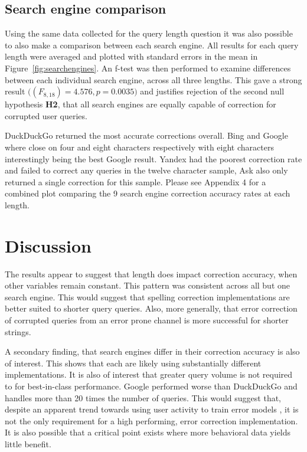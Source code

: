 \documentclass{csfourzero}
\begin{document}
\subsection{Search engine comparison}
Using the same data collected for the query length question it was also possible to also make a comparison between each search engine. All results for each query length were averaged and plotted with standard errors in the mean in Figure~\ref{fig:searchengines}. An f-test was then performed to examine differences between each individual search engine, across all three lengths. This gave a strong result $\big((F_{8,18}) = 4.576, p = 0.0035\big)$ and justifies rejection of the second null hypothesis \textbf{H2}, that all search engines are equally capable of correction for corrupted user queries.

DuckDuckGo returned the most accurate corrections overall. Bing and Google where close on four and eight characters respectively with eight characters interestingly being the best Google result. Yandex had the poorest correction rate and failed to correct any queries in the twelve character sample, Ask also only returned a single correction for this sample. Please see Appendix 4 for a combined plot comparing the 9 search engine correction accuracy rates at each length.

\section{Discussion}
\label{sec:discuss}

The results appear to suggest that length does impact correction accuracy, when other variables remain constant. This pattern was consistent across all but one search engine. This would suggest that spelling correction implementations are better suited to shorter query queries. Also, more generally, that error correction of corrupted queries from an error prone channel is more successful for shorter strings.

A secondary finding, that search engines differ in their correction accuracy is also of interest. This shows that each are likely using substantially different implementations. It is also of interest that greater query volume is not required to for best-in-class performance. Google performed worse than DuckDuckGo and handles more than 20 times the number of queries. This would suggest that, despite an apparent trend towards using user activity to train error models \cite{webuserpoweredspelling, webuser3, webuser2learningerrormodel, webuser4google2009}, it is not the only requirement for a high performing, error correction implementation. It is also possible that a critical point exists where more behavioral data yields little benefit.
\end{document}
